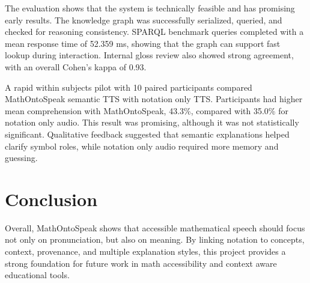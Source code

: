\documentclass[10pt]{article}
\begin{document}
The evaluation shows that the system is technically feasible and has promising early results. The knowledge graph was successfully serialized, queried, and checked for reasoning consistency. SPARQL benchmark queries completed with a mean response time of 52.359 ms, showing that the graph can support fast lookup during interaction. Internal gloss review also showed strong agreement, with an overall Cohen's kappa of 0.93.

A rapid within subjects pilot with 10 paired participants compared MathOntoSpeak semantic TTS with notation only TTS. Participants had higher mean comprehension with MathOntoSpeak, 43.3\%, compared with 35.0\% for notation only audio. This result was promising, although it was not statistically significant. Qualitative feedback suggested that semantic explanations helped clarify symbol roles, while notation only audio required more memory and guessing.

\section*{Conclusion}

Overall, MathOntoSpeak shows that accessible mathematical speech should focus not only on pronunciation, but also on meaning. By linking notation to concepts, context, provenance, and multiple explanation styles, this project provides a strong foundation for future work in math accessibility and context aware educational tools.
\end{document}
